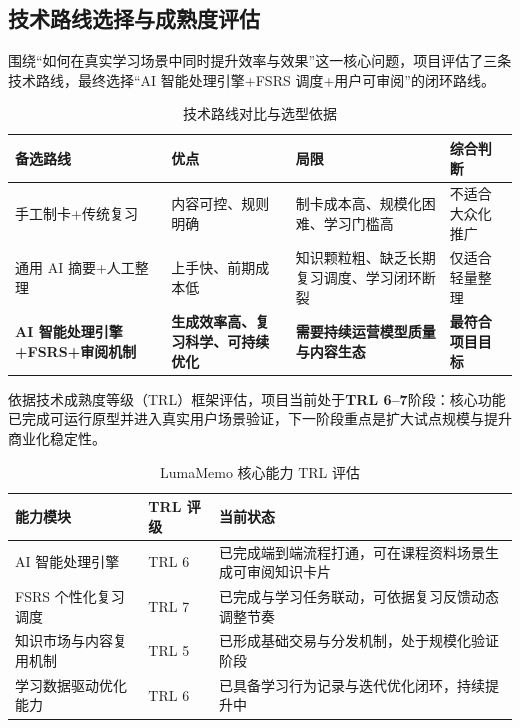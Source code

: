 \subsection{技术路线选择与成熟度评估}

围绕“如何在真实学习场景中同时提升效率与效果”这一核心问题，项目评估了三条技术路线，最终选择“AI 智能处理引擎+FSRS 调度+用户可审阅”的闭环路线。

\begin{table}[htbp]
	\centering
	\caption{技术路线对比与选型依据}
	\label{tab:chap3_route_compare}
	\begin{tabular}{p{3.2cm}p{3.8cm}p{3.8cm}p{3.0cm}}
		\toprule
		\textbf{备选路线} & \textbf{优点} & \textbf{局限} & \textbf{综合判断} \\
		\midrule
		手工制卡+传统复习 & 内容可控、规则明确 & 制卡成本高、规模化困难、学习门槛高 & 不适合大众化推广 \\
		通用 AI 摘要+人工整理 & 上手快、前期成本低 & 知识颗粒粗、缺乏长期复习调度、学习闭环断裂 & 仅适合轻量整理 \\
		\textbf{AI 智能处理引擎+FSRS+审阅机制} & \textbf{生成效率高、复习科学、可持续优化} & \textbf{需要持续运营模型质量与内容生态} & \textbf{最符合项目目标} \\
		\bottomrule
	\end{tabular}
\end{table}

依据技术成熟度等级（TRL）框架评估，项目当前处于\textbf{TRL 6--7}阶段：核心功能已完成可运行原型并进入真实用户场景验证，下一阶段重点是扩大试点规模与提升商业化稳定性。

\begin{table}[htbp]
	\centering
	\caption{LumaMemo 核心能力 TRL 评估}
	\label{tab:chap3_trl}
	\begin{tabular}{p{4.2cm}p{2.2cm}p{7.2cm}}
		\toprule
		\textbf{能力模块} & \textbf{TRL 评级} & \textbf{当前状态} \\
		\midrule
		AI 智能处理引擎 & TRL 6 & 已完成端到端流程打通，可在课程资料场景生成可审阅知识卡片 \\
		FSRS 个性化复习调度 & TRL 7 & 已完成与学习任务联动，可依据复习反馈动态调整节奏 \\
		知识市场与内容复用机制 & TRL 5 & 已形成基础交易与分发机制，处于规模化验证阶段 \\
		学习数据驱动优化能力 & TRL 6 & 已具备学习行为记录与迭代优化闭环，持续提升中 \\
		\bottomrule
	\end{tabular}
\end{table}

